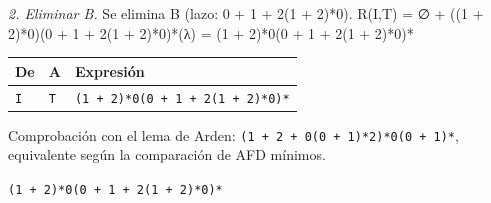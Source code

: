 \documentclass[11pt]{article}
\begin{document}
\textit{2. Eliminar B.} Se elimina B (lazo: 0 + 1 + 2(1 + 2)*0). R(I,T) = ∅ + ((1 + 2)*0)(0 + 1 + 2(1 + 2)*0)*(λ) = (1 + 2)*0(0 + 1 + 2(1 + 2)*0)*
\begin{center}\footnotesize\begin{tabular}{lll}\toprule
De & A & Expresión \\\midrule
\texttt{I} & \texttt{T} & \texttt{(1 + 2)*0(0 + 1 + 2(1 + 2)*0)*} \\
\bottomrule\end{tabular}\end{center}
Comprobación con el lema de Arden: \texttt{(1 + 2 + 0(0 + 1)*2)*0(0 + 1)*}, equivalente según la comparación de AFD mínimos.

\resp \texttt{(1 + 2)*0(0 + 1 + 2(1 + 2)*0)*}
\end{document}
